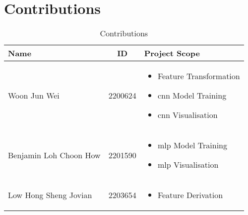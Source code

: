\section{Contributions}\label{contribution}

\begin{table}[htbp]
  \caption{Contributions}\label{tab:contributions}
  \centering
  \begin{tabular}{p{5cm}|c|p{8cm}}
    \hline
    \textbf{Name} & \textbf{ID} & \textbf{Project Scope} \\
    \hline
        Woon Jun Wei & 2200624 &
        \begin{itemize}
            \item Feature Transformation
            \item \gls{cnn} Model Training
            \item \gls{cnn} Visualisation
        \end{itemize}\\
        \hline
        Benjamin Loh Choon How & 2201590 &
        \begin{itemize}
            \item \gls{mlp} Model Training
            \item \gls{mlp} Visualisation
        \end{itemize}\\
        \hline
        Low Hong Sheng Jovian & 2203654 &
        \begin{itemize}
            \item Feature Derivation
        \end{itemize}\\
    \hline
  \end{tabular}
\end{table}